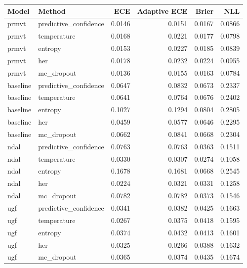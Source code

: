 \begin{tabular}{llrrrr}
\hline
Model & Method & ECE & Adaptive ECE & Brier & NLL \\
\hline
prmvt & predictive\_confidence & 0.0146 & 0.0151 & 0.0167 & 0.0866 \\
prmvt & temperature & 0.0168 & 0.0221 & 0.0177 & 0.0798 \\
prmvt & entropy & 0.0153 & 0.0227 & 0.0185 & 0.0839 \\
prmvt & her & 0.0178 & 0.0232 & 0.0224 & 0.0955 \\
prmvt & mc\_dropout & 0.0136 & 0.0155 & 0.0163 & 0.0784 \\
baseline & predictive\_confidence & 0.0647 & 0.0832 & 0.0673 & 0.2337 \\
baseline & temperature & 0.0641 & 0.0764 & 0.0676 & 0.2402 \\
baseline & entropy & 0.1027 & 0.1294 & 0.0804 & 0.2805 \\
baseline & her & 0.0459 & 0.0577 & 0.0646 & 0.2295 \\
baseline & mc\_dropout & 0.0662 & 0.0841 & 0.0668 & 0.2304 \\
ndal & predictive\_confidence & 0.0763 & 0.0763 & 0.0363 & 0.1511 \\
ndal & temperature & 0.0330 & 0.0307 & 0.0274 & 0.1058 \\
ndal & entropy & 0.1678 & 0.1681 & 0.0668 & 0.2545 \\
ndal & her & 0.0224 & 0.0321 & 0.0331 & 0.1258 \\
ndal & mc\_dropout & 0.0782 & 0.0782 & 0.0373 & 0.1546 \\
ugf & predictive\_confidence & 0.0341 & 0.0382 & 0.0425 & 0.1663 \\
ugf & temperature & 0.0267 & 0.0375 & 0.0418 & 0.1595 \\
ugf & entropy & 0.0374 & 0.0432 & 0.0413 & 0.1601 \\
ugf & her & 0.0325 & 0.0266 & 0.0388 & 0.1632 \\
ugf & mc\_dropout & 0.0365 & 0.0374 & 0.0435 & 0.1674 \\
\hline
\end{tabular}
